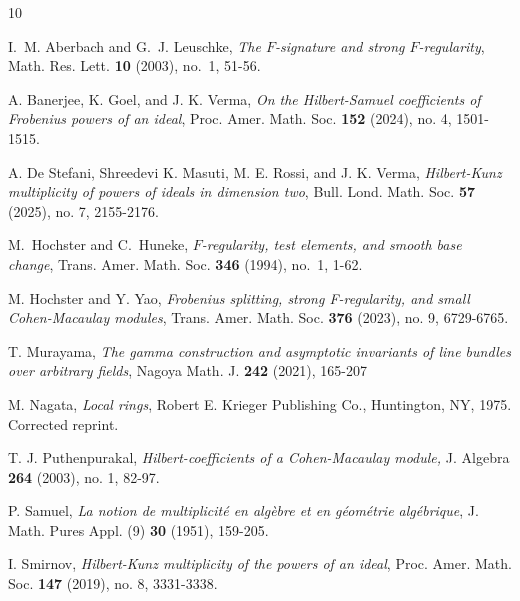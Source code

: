 \documentclass[11pt, reqno]{amsart}
\theoremstyle{plain}
\theoremstyle{plain}
\begin{document}
\providecommand{\bysame}{\leavevmode\hbox to3em{\hrulefill}\thinspace}
\providecommand{\MR}{\relax\ifhmode\unskip\space\fi MR }
\providecommand{\MRhref}[2]{
  \href{http://www.ams.org/mathscinet-getitem?mr=#1}{#2}
}
\begin{thebibliography}{10}







I.~M. Aberbach and G.~J. Leuschke,
\emph{The $F$-signature and strong $F$-regularity}, Math. Res. Lett. \textbf{10} (2003), no.~1, 51-56.

  A. Banerjee, K. Goel, and J. K. Verma, \emph{On the Hilbert-Samuel coefficients of Frobenius powers of an ideal}, Proc. Amer. Math. Soc. \textbf{152} (2024), no. 4, 1501-1515.

 A. De Stefani, Shreedevi K. Masuti, M. E. Rossi, and J. K. Verma, \emph{Hilbert-Kunz multiplicity of powers of ideals in dimension two}, Bull. Lond. Math. Soc. \textbf{57} (2025), no. 7, 2155-2176.

 M.~Hochster and C.~Huneke,
\emph{$F$-regularity, test elements, and smooth base change}, Trans. Amer. Math. Soc. \textbf{346} (1994), no.~1, 1-62.

 M. Hochster and Y. Yao, \emph{Frobenius splitting, strong F-regularity, and small Cohen-Macaulay modules}, Trans. Amer. Math. Soc. \textbf{376} (2023), no. 9, 6729-6765.

 T. Murayama, \emph{The gamma construction and asymptotic invariants of line bundles over arbitrary fields}, Nagoya Math. J. \textbf{242} (2021), 165-207

 M. Nagata, \emph{Local rings}, Robert E. Krieger Publishing Co., Huntington, NY, 1975. Corrected reprint.

 T. J. Puthenpurakal, \emph{Hilbert-coefficients of a Cohen-Macaulay module,} J. Algebra \textbf{264} (2003), no. 1, 82-97.

 P. Samuel, \emph{La notion de multiplicité en algèbre et en géométrie algébrique}, J. Math. Pures Appl. (9) \textbf{30} (1951), 159-205.


 I. Smirnov, \emph{Hilbert-Kunz multiplicity of the powers of an ideal}, Proc. Amer. Math. Soc. \textbf{147} (2019), no. 8, 3331-3338.


\end{thebibliography}
\end{document}

